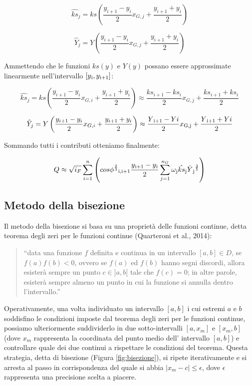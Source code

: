 \documentclass[12pt]{article} %
\begin{document}
\begin{equation}
    \hat{ks}_{j}=ks\left(\frac{y_{i+1}-y_{i}}{2}x_{G,j}+\frac{y_{i+1}+y_{i}}{2}\right)
\end{equation}

\begin{equation}
    \hat{Y}_{j}=Y\left(\frac{y_{i+1}-y_{i}}{2}x_{G,j}+\frac{y_{i+1}+y_{i}}{2}\right)
\end{equation}

\noindent Ammettendo che le funzioni $ks(y)$ e $Y(y)$ possano essere approssimate linearmente nell’intervallo $[y\textsubscript{i}, y\textsubscript{i+1}]$:

\begin{equation}
    \hat{ks}_{j}=ks\left(\frac{y_{i+1}-y_{i}}{2}x_{G,i}+\frac{y_{i+1}+y_{i}}{2}\right)\approx\frac{ks_{i+1}-ks_{i}}{2}x_{G,j}+\frac{ks_{i+1}+ks_{i}}{2}
\end{equation}

\begin{equation}
    \hat{Y}_{j}=Y\left(\frac{y_{i+1}-y_{i}}{2}x_{G,i}+\frac{y_{i+1}+y_{i}}{2}\right)\approx\frac{Y\textsubscript{i+1}-Y{i}}{2}x\textsubscript{G,j}+\frac{Y\textsubscript{i+1}+Y{i}}{2}
\end{equation}

\noindent Sommando tutti i contributi otteniamo finalmente:

\begin{equation}
    Q\approx\sqrt{i_F}\sum_{i=1}^n\left(cos\phi^{\frac{2}{3}}\textsubscript{i,i+1}\frac{y\textsubscript{i+1}-y\textsubscript{i}}{2}\sum_{j=1}^{n_G}\omega\textsubscript{j}\hat{ks}\textsubscript{j}\hat{Y}\textsubscript{j}^{\frac{3}{5}}\right)
    \label{eqn:Q_Gauss-Legendre_2}
\end{equation}

\subsection{Metodo della bisezione}

\noindent Il metodo della bisezione si basa su una proprietà delle funzioni continue, detta teorema degli zeri per le funzioni continue (Quarteroni et al., 2014):
\begin{quote}
“data una funzione $f$ definita e continua in un intervallo $[a,b] \in D$, se $f(a) f(b)  < 0$, ovvero se  $f(a)$ ed $f(b)$ hanno segni discordi, allora esisterà sempre un punto $c \in ]a,b[$ tale che $f(c) = 0$; in altre parole, esisterà sempre almeno un punto in cui la funzione si annulla dentro l’intervallo.”
\end{quote}
\noindent Operativamente, una volta individuato un intervallo $[a,b]$ i cui estremi $a$ e $b$ soddisfino le condizioni imposte dal teorema degli zeri per le funzioni continue, possiamo ulteriormente suddividerlo in due sotto-intervalli $[a,x_m]$ e $[x_m,b]$ (dove $x_m$ rappresenta la coordinata del punto medio dell’ intervallo $[a,b]$) e controllare quale dei due continui a rispettare le condizioni del teorema. Questa strategia, detta di bisezione (Figura \ref{fig:bisezione}), si ripete iterativamente e si arresta al passo in corrispondenza del quale si abbia $|x_m - c| \leq \epsilon$, dove $\epsilon$ rappresenta una precisione scelta a piacere.
\end{document}

